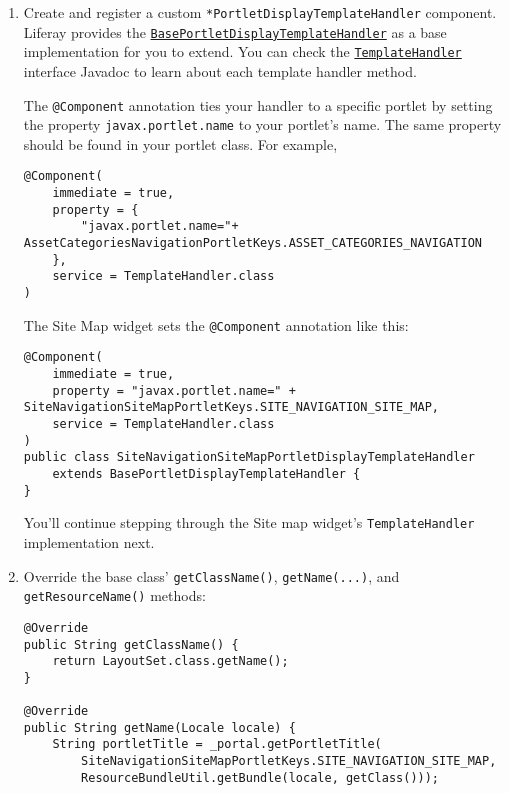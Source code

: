 \begin{enumerate}
\def\labelenumi{\arabic{enumi}.}
\item
  Create and register a custom \texttt{*PortletDisplayTemplateHandler}
  component. Liferay provides the
  \href{https://docs.liferay.com/dxp/portal/7.2-latest/javadocs/portal-kernel/com/liferay/portal/kernel/portletdisplaytemplate/BasePortletDisplayTemplateHandler.html}{\texttt{BasePortletDisplayTemplateHandler}}
  as a base implementation for you to extend. You can check the
  \href{https://docs.liferay.com/dxp/portal/7.2-latest/javadocs/portal-kernel/com/liferay/portal/kernel/template/TemplateHandler.html}{\texttt{TemplateHandler}}
  interface Javadoc to learn about each template handler method.

  The \texttt{@Component} annotation ties your handler to a specific
  portlet by setting the property \texttt{javax.portlet.name} to your
  portlet's name. The same property should be found in your portlet
  class. For example,

\begin{verbatim}
@Component(
    immediate = true,
    property = {
        "javax.portlet.name="+ AssetCategoriesNavigationPortletKeys.ASSET_CATEGORIES_NAVIGATION
    },
    service = TemplateHandler.class
)
\end{verbatim}

  The Site Map widget sets the \texttt{@Component} annotation like this:

\begin{verbatim}
@Component(
    immediate = true,
    property = "javax.portlet.name=" + SiteNavigationSiteMapPortletKeys.SITE_NAVIGATION_SITE_MAP,
    service = TemplateHandler.class
)
public class SiteNavigationSiteMapPortletDisplayTemplateHandler
    extends BasePortletDisplayTemplateHandler {
}
\end{verbatim}

  You'll continue stepping through the Site map widget's
  \texttt{TemplateHandler} implementation next.
\item
  Override the base class' \texttt{getClassName()},
  \texttt{getName(...)}, and \texttt{getResourceName()} methods:

\begin{verbatim}
@Override
public String getClassName() {
    return LayoutSet.class.getName();
}

@Override
public String getName(Locale locale) {
    String portletTitle = _portal.getPortletTitle(
        SiteNavigationSiteMapPortletKeys.SITE_NAVIGATION_SITE_MAP,
        ResourceBundleUtil.getBundle(locale, getClass()));


\end{verbatim}
\end{enumerate}
